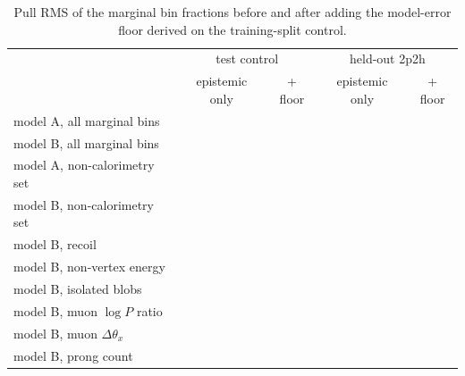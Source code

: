 \documentclass[11pt]{article}
\begin{document}
\begin{table}[h]\centering\footnotesize
\begin{tabular}{lcccc}
\toprule
 & \multicolumn{2}{c}{test control} & \multicolumn{2}{c}{held-out 2p2h} \\
 & epistemic only & + floor & epistemic only & + floor \\
\midrule
model A, all marginal bins & \nBayACtlMargPullRMS{} & \nFloorARmsCtlRMS{} & \nBayAOODMargPullRMS{} & \nFloorARmsOODRMS{} \\
model B, all marginal bins & \nBayBCtlMargPullRMS{} & \nFloorBRmsCtlRMS{} & \nBayBOODMargPullRMS{} & \nFloorBRmsOODRMS{} \\
model A, non-calorimetry set & \nCIAMargCtlRMS{} & \nCIAFloorCtlRMS{} & \nCIAMargOODRMS{} & \nCIAFloorOODRMS{} \\
model B, non-calorimetry set & \nCIBMargCtlRMS{} & \nCIBFloorCtlRMS{} & \nCIBMargOODRMS{} & \nCIBFloorOODRMS{} \\
\midrule
model B, recoil & & & & \nFloorBRmsRecoilOOD{} \\
model B, non-vertex energy & & & & \nFloorBRmsNvtxOOD{} \\
model B, isolated blobs & & & & \nFloorBRmsBlobsOOD{} \\
model B, muon $\log P$ ratio & & & & \nFloorBRmsMuPOOD{} \\
model B, muon $\Delta\theta_x$ & & & & \nFloorBRmsDthxOOD{} \\
model B, prong count & & & & \nFloorBRmsNprongOOD{} \\
\bottomrule
\end{tabular}
\caption{Pull RMS of the marginal bin fractions before and after adding the model-error floor derived on the
training-split control.}
\label{tab:floor}
\end{table}
\end{document}
